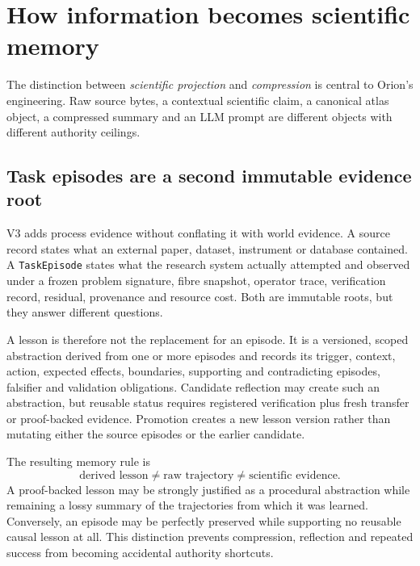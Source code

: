 \section{How information becomes scientific memory}
The distinction between \emph{scientific projection} and \emph{compression} is central to Orion's engineering. Raw source bytes, a contextual scientific claim, a canonical atlas object, a compressed summary and an LLM prompt are different objects with different authority ceilings.


\subsection{Task episodes are a second immutable evidence root}
V3 adds process evidence without conflating it with world evidence. A source record states what an external paper, dataset, instrument or database contained. A \texttt{TaskEpisode} states what the research system actually attempted and observed under a frozen problem signature, fibre snapshot, operator trace, verification record, residual, provenance and resource cost. Both are immutable roots, but they answer different questions.

A lesson is therefore not the replacement for an episode. It is a versioned, scoped abstraction derived from one or more episodes and records its trigger, context, action, expected effects, boundaries, supporting and contradicting episodes, falsifier and validation obligations. Candidate reflection may create such an abstraction, but reusable status requires registered verification plus fresh transfer or proof-backed evidence. Promotion creates a new lesson version rather than mutating either the source episodes or the earlier candidate.

The resulting memory rule is
\begin{equation}
\text{derived lesson}\neq\text{raw trajectory}\neq\text{scientific evidence}.
\end{equation}
A proof-backed lesson may be strongly justified as a procedural abstraction while remaining a lossy summary of the trajectories from which it was learned. Conversely, an episode may be perfectly preserved while supporting no reusable causal lesson at all. This distinction prevents compression, reflection and repeated success from becoming accidental authority shortcuts.

